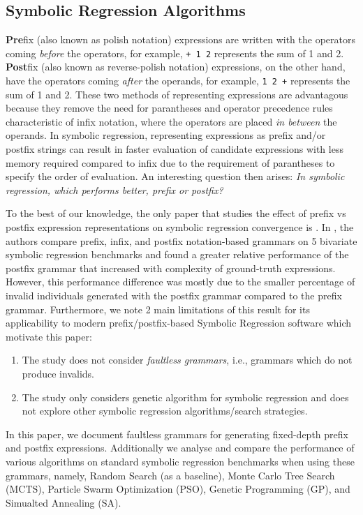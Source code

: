 \documentclass[runningheads]{llncs}
\begin{document}
\subsection{Symbolic Regression Algorithms}
\textbf{Pre}fix (also known as polish notation) expressions are written with the operators coming \emph{before} the operators, for example, \texttt{+ 1 2} represents the sum of 1 and 2. \textbf{Post}fix (also known as reverse-polish notation) expressions, on the other hand, have the operators coming \emph{after} the operands, for example, \texttt{1 2 +} represents the sum of 1 and 2. These two methods of representing expressions are advantagous because they remove the need for parantheses and operator precedence rules characteristic of infix notation, where the operators are placed \emph{in between} the operands. In symbolic regression, representing expressions as prefix and/or postfix strings can result in faster evaluation of candidate expressions with less memory required compared to infix due to the requirement of parantheses to specify the order of evaluation. An interesting question then arises: \emph{In symbolic regression, which performs better, prefix or postfix?}
\par To the best of our knowledge, the only paper that studies the effect of prefix vs postfix expression representations on symbolic regression convergence is \cite{hemberg2008pre}.  In \cite{hemberg2008pre}, the authors compare prefix, infix, and postfix notation-based grammars on 5 bivariate symbolic regression benchmarks and found a greater relative performance of the postfix grammar that increased with complexity of ground-truth expressions. 
However, this performance difference was mostly due to the smaller percentage of invalid individuals generated with the postfix grammar compared to the prefix grammar.  
Furthermore, we note 2 main limitations of this result for its applicability to modern prefix/postfix-based Symbolic Regression software which motivate this paper:
\begin{enumerate}
\item The study does not consider \emph{faultless grammars}, i.e., grammars which do not produce invalids.
\item The study only considers genetic algorithm for symbolic regression and does not explore other symbolic regression algorithms/search strategies. 
\end{enumerate}
In this paper, we document faultless grammars for generating fixed-depth prefix and postfix expressions. Additionally we analyse and compare the performance of various algorithms on standard symbolic regression benchmarks when using these grammars, namely, Random Search (as a baseline), Monte Carlo Tree Search (MCTS), Particle Swarm Optimization (PSO), Genetic Programming (GP), and Simualted Annealing (SA). 
\end{document}

